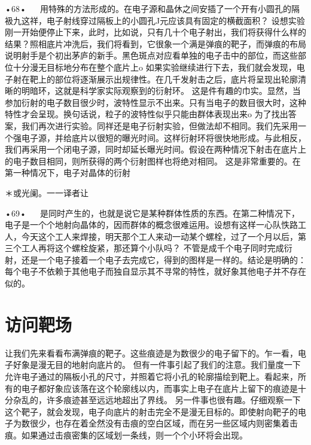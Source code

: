 •68•
  
用特殊的方法形成的。在电子源和晶休之间安插了一个开有小圆孔的隔衱九这祥，电子射线穿过隔板上的小圆孔J元应该具有固定的横截面积？
设想实验刚一开始便停止下来，此时，比如说，只有几十个电子射出，我们将获得什么样的结果？照相底片冲洗后，我们将看到，它很象一个满是弹痕的靶子，而弹痕的布局说明射手是个初出茅庐的新手。黑色斑点对应看单独的电子击中的部位，而这些部位十分漫无目标地分布在整个底片上o
如果实验继续进行下去，我们就会发现，电子射在靶上的部位将逐渐展示出规律性。在几千发射击之后，底片将呈现出轮廓清晰的明暗环，这就是科学家实际观察到的衍射环。
这是件有趣的巾实。显然，当参加衍射的电子数目很少时，波特性显示不出来。只有当电子的数目很大时，这种特性才会呈现。换句话说，粒子的波特性似乎只能由群体表现出来o
为了找出答案，我们再次进行实验。同祥还是电子衍射实验，但做法却不相同。我们先采用一个强电子源，并给底片以很短的曝光时间。这样衍射环将很快地形成。与此相反，我们再采用一个闭电子源，同时却延长曝光时间。假设在两种情况下射击在底片上的电子数目相同，则所获得的两个衍射图样也将绝对相同。
这是非常重要的。在第一种情况下，电子对晶体的衍射

＊或光阑。一一译者让

•69•
  
是同时产生的，也就是说它是某种群体性质的东西。在第二种情况下，电子是一个个地射向晶体的，因而群体的概念很难运用。设想有这样一心队怢路工人，今天这个工人来焊接，明天那个工人来动一动某个螺栓，过了一个月以后，第三个工人再将这个螺栓旋紧，那还算个小队吗？
不管是成千个电子同时完成衍射，还是一个电子接着一个电子去完成它，得到的图样是一样的。结论是明确的：每个电子不依赖于其他电子而独自显示其不寻常的特性，就好象其他电子并不存在似的。

\section{访问靶场}

让我们先来看看布满弹痕的靶子。这些痕迹是为数很少的电子留下的。乍一看，电子好象是漫无目的地射向底片的。
但有一件事引起了我们的注意。我们量度一下允许电子通过的隔板小孔的尺寸，并照着它将小孔的轮廓描绘到靶上。看起来，所有的电子都好象应该落在这个轮廓线以内，而事实上电子在底片上留下的痕迹是十分杂乱的，许多痕迹甚至远远地超出了界线。
另一件事也很有趣。仔细观察一下这个靶子，就会发现，电子向底片的射击完全不是漫无目标的。即使射向靶子的电子为数很少，也存在着全然没有击痕的空白区域，而在另一些区域内则密集着击痕。如果通过击痕密集的区域划一条线，则一个个小环将会出现。

